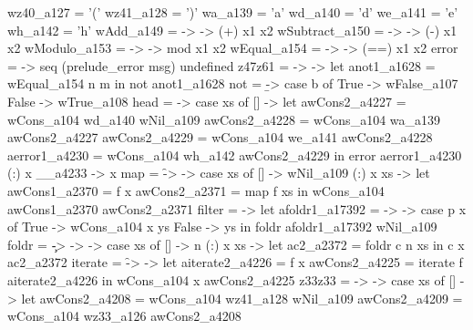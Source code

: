           wz40_a127 = '('
          wz41_a128 = ')'
          wa_a139 = 'a'
          wd_a140 = 'd'
          we_a141 = 'e'
          wh_a142 = 'h'
          wAdd_a149 =  ->  -> (+) x1 x2
          wSubtract_a150 =  ->  -> (-) x1 x2
          wModulo_a153 =  ->  -> mod x1 x2
          wEqual_a154 =  ->  -> (==) x1 x2
          error = \msg -> seq (prelude_error msg) undefined
          z47z61 = \n -> \m -> let anot1_a1628 = wEqual_a154 n m
                               in not anot1_a1628
          not = \b -> case b of
                        True -> wFalse_a107
                        False -> wTrue_a108
          head = \xs -> case xs of
                          [] ->
                            let
                              awCons2_a4227 = wCons_a104 wd_a140 wNil_a109
                              awCons2_a4228 = wCons_a104 wa_a139 awCons2_a4227
                              awCons2_a4229 = wCons_a104 we_a141 awCons2_a4228
                              aerror1_a4230 = wCons_a104 wh_a142 awCons2_a4229
                            in error aerror1_a4230
                          (:) x __a4233 -> x
          map = \f -> \xs -> case xs of
                               [] -> wNil_a109
                               (:) x xs ->
                                 let
                                   awCons1_a2370 = f x
                                   awCons2_a2371 = map f xs
                                 in wCons_a104 awCons1_a2370 awCons2_a2371
          filter = \p -> let
                           afoldr1_a17392 = \x -> \ys -> case p x of
                                                           True -> wCons_a104 x ys
                                                           False -> ys
                         in foldr afoldr1_a17392 wNil_a109
          foldr = \c -> \n -> \xs -> case xs of
                                       [] -> n
                                       (:) x xs ->
                                         let ac2_a2372 = foldr c n xs
                                         in c x ac2_a2372
          iterate = \f -> \x -> let
                                  aiterate2_a4226 = f x
                                  awCons2_a4225 = iterate f aiterate2_a4226
                                in wCons_a104 x awCons2_a4225
          z33z33 = \xs -> \y -> case xs of
                                  [] ->
                                    let
                                      awCons2_a4208 = wCons_a104 wz41_a128 wNil_a109
                                      awCons2_a4209 = wCons_a104 wz33_a126 awCons2_a4208
